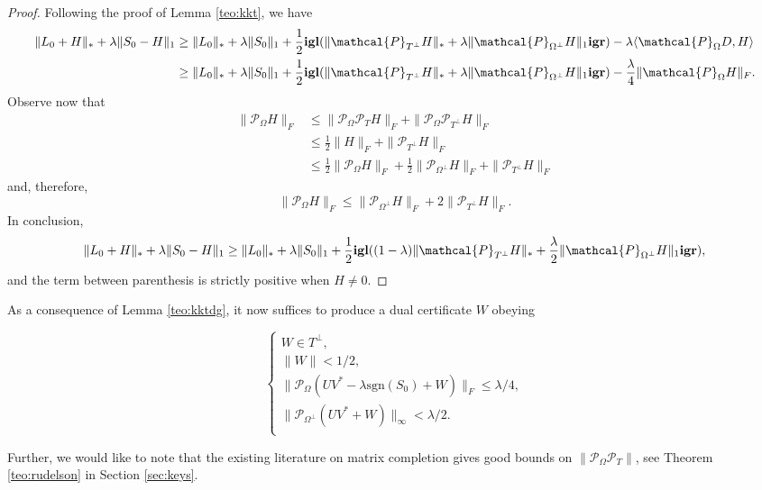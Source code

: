 \begin{proof} 
  Following the proof of Lemma \ref{teo:kkt}, we have
\begin{align*}
  \|L_0 + H\|_* + \lambda \|S_0 - H\|_1 & \ge \|L_0\|_* + \lambda
  \|S_0\|_1 + \frac12 \mathbf{igl}(\|\mathcal{P}_{T^\perp} H\|_* + \lambda \|\mathcal{P}_{\Omega^\perp} H\|_1\mathbf{igr})
  - \lambda \langle\mathcal{P}_{\Omega} D, H\rangle\\
  & \ge \|L_0\|_* + \lambda \|S_0\|_1 + \frac12 \mathbf{igl}(\|\mathcal{P}_{T^\perp} H\|_* +
  \lambda \|\mathcal{P}_{\Omega^\perp} H\|_1\mathbf{igr}) - {\lambda \over 4} \|\mathcal{P}_{\Omega} H\|_F.
\end{align*}
Observe now that 
\begin{align*}
  \|\mathcal{P}_{\Omega} H\|_F & \le \|\mathcal{P}_{\Omega} \mathcal{P}_T H\|_F  + \|\mathcal{P}_{\Omega} \mathcal{P}_{T^\perp} H\|_F  \\
  & \le \frac12 \|H\|_F + \|\mathcal{P}_{T^\perp} H\|_F \\
  & \le \frac12\|\mathcal{P}_{\Omega} H\|_F + \frac12 \|\mathcal{P}_{\Omega^\perp} H\|_F  + \|\mathcal{P}_{T^\perp} H\|_F 
\end{align*}
and, therefore, 
\[
 \|\mathcal{P}_{\Omega} H\|_F \le  \|\mathcal{P}_{\Omega^\perp} H\|_F  + 2 \|\mathcal{P}_{T^\perp} H\|_F. 
\]
In conclusion, 
\[
\|L_0 + H\|_* + \lambda \|S_0 - H\|_1 \ge \|L_0\|_* + \lambda
\|S_0\|_1 + \frac12 \mathbf{igl}((1-\lambda) \|\mathcal{P}_{T^\perp} H\|_* + {\lambda \over 2}
\|\mathcal{P}_{\Omega^\perp} H\|_1\mathbf{igr}),
\]
and the term between parenthesis is strictly positive when $H \neq
0$. 
\end{proof}

As a consequence of Lemma \ref{teo:kktdg}, it now suffices to produce a dual certificate $W$ obeying

\begin{equation}
\label{eq:dual-certif-dg}
\begin{cases} W \in T^\perp, \\
  \|W\| < 1/2,\\
  \|\mathcal{P}_{\Omega}(UV^* -\lambda \textrm{sgn}(S_0) + W)\|_F \le \lambda/4,\\
  \|\mathcal{P}_{\Omega^\perp}(UV^* + W)\|_\infty < \lambda/2.\\
\end{cases}
\end{equation}

Further, we would like to note that the existing literature on matrix completion \cite{CR08} gives good bounds on $\|\mathcal{P}_{\Omega}\mathcal{P}_T\|$, see Theorem
\ref{teo:rudelson} in Section \ref{sec:keys}.

